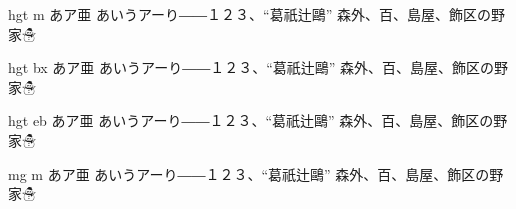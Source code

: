 \documentclass[dvipdfmx,uplatex,9pt]{jsarticle}
\begin{document}
\selectfont hgt m あア亜
あいうアーり――１２３、“葛祇辻鷗” 森外、百、島屋、飾区の野家☃

\selectfont hgt bx あア亜
あいうアーり――１２３、“葛祇辻鷗” 森外、百、島屋、飾区の野家☃

\selectfont hgt eb あア亜
あいうアーり――１２３、“葛祇辻鷗” 森外、百、島屋、飾区の野家☃


\selectfont mg m あア亜
あいうアーり――１２３、“葛祇辻鷗” 森外、百、島屋、飾区の野家☃
\end{document}

